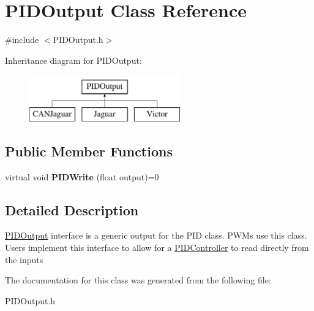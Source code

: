\hypertarget{classPIDOutput}{
\section{PIDOutput Class Reference}
\label{classPIDOutput}
}


{\ttfamily \#include $<$PIDOutput.h$>$}

Inheritance diagram for PIDOutput:\begin{figure}[H]
\begin{center}
\leavevmode
\includegraphics[height=2.000000cm]{classPIDOutput}
\end{center}
\end{figure}
\subsection*{Public Member Functions}
\begin{DoxyCompactItemize}
\item 
\hypertarget{classPIDOutput_abec3beb51de7fc129520b99ca133a1a7}{
virtual void {\bfseries PIDWrite} (float output)=0}
\label{classPIDOutput_abec3beb51de7fc129520b99ca133a1a7}

\end{DoxyCompactItemize}


\subsection{Detailed Description}
\hyperlink{classPIDOutput}{PIDOutput} interface is a generic output for the PID class. PWMs use this class. Users implement this interface to allow for a \hyperlink{classPIDController}{PIDController} to read directly from the inputs 

The documentation for this class was generated from the following file:\begin{DoxyCompactItemize}
\item 
PIDOutput.h\end{DoxyCompactItemize}
